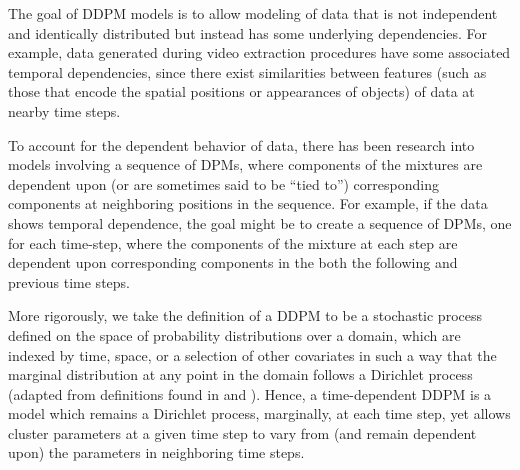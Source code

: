 \documentclass{article}
\begin{document}
The goal of DDPM models is to allow modeling of data that is not independent and identically distributed but instead has some underlying dependencies. For example, data generated during video extraction procedures have some associated temporal dependencies, since there exist similarities between features (such as those that encode the spatial positions or appearances of objects) of data at nearby time steps.

To account for the dependent behavior of data, there has been research into models involving a sequence of DPMs, where components of the mixtures are dependent upon (or are sometimes said to be ``tied to'') corresponding components at neighboring positions in the sequence. For example, if the data shows temporal dependence, the goal might be to create a sequence of DPMs, one for each time-step, where the components of the mixture at each step are dependent upon corresponding components in the both the following and previous time steps.

More rigorously, we take the definition of a DDPM to be a stochastic process defined on the space of probability distributions over a domain, which are indexed by time, space, or a selection of other covariates in such a way that the marginal distribution at any point in the domain follows a Dirichlet process (adapted from definitions found in \cite{gasthaus_thesis} and \cite{griffin2006order}). Hence, a time-dependent DDPM is a model which remains a Dirichlet process, marginally, at each time step, yet allows cluster parameters at a given time step to vary from (and remain dependent upon) the parameters in neighboring time steps.



\end{document}
